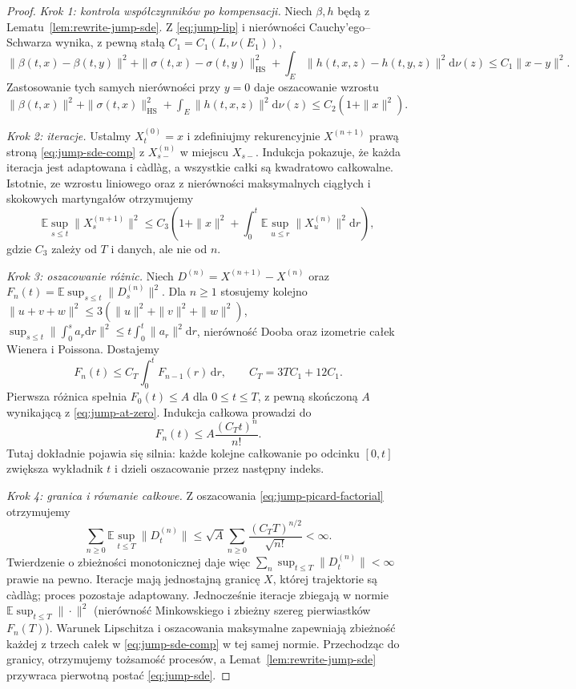 \documentclass[11pt,a4paper,oneside]{report}
\numberwithin{equation}{chapter}
\theoremstyle{plain}
\theoremstyle{definition}
\theoremstyle{remark}
\newcommand{\E}{\mathbb{E}}
\newcommand{\dd}{\mathrm{d}}
\begin{document}
\begin{proof}
\emph{Krok 1: kontrola współczynników po kompensacji.}
Niech $\beta,h$ będą z Lematu~\ref{lem:rewrite-jump-sde}.
Z \eqref{eq:jump-lip} i nierówności Cauchy'ego--Schwarza
wynika, z pewną stałą $C_1=C_1(L,\nu(E_1))$,
\[
\|\beta(t,x)-\beta(t,y)\|^2
+\|\sigma(t,x)-\sigma(t,y)\|_{\mathrm{HS}}^2
+\int_E\|h(t,x,z)-h(t,y,z)\|^2\dd\nu(z)
\le C_1\|x-y\|^2.
\]
Zastosowanie tych samych nierówności przy $y=0$ daje
oszacowanie wzrostu
$\|\beta(t,x)\|^2+\|\sigma(t,x)\|_{\mathrm{HS}}^2+
\int_E\|h(t,x,z)\|^2\dd\nu(z)
\le C_2(1+\|x\|^2)$.

\emph{Krok 2: iteracje.} Ustalmy $X^{(0)}_t=x$ i
zdefiniujmy rekurencyjnie $X^{(n+1)}$ prawą stroną
\eqref{eq:jump-sde-comp} z $X^{(n)}_{s-}$ w miejscu $X_{s-}$.
Indukcja pokazuje, że każda iteracja jest adaptowana i càdlàg,
a wszystkie całki są kwadratowo całkowalne. Istotnie,
ze wzrostu liniowego oraz z nierówności maksymalnych
ciągłych i skokowych martyngałów otrzymujemy
\[
\E\sup_{s\le t}\|X^{(n+1)}_s\|^2
\le C_3\left(1+\|x\|^2+
 \int_0^t\E\sup_{u\le r}\|X^{(n)}_u\|^2\dd r\right),
\]
gdzie $C_3$ zależy od $T$ i danych, ale nie od $n$.

\emph{Krok 3: oszacowanie różnic.} Niech
$D^{(n)}=X^{(n+1)}-X^{(n)}$ oraz
$F_n(t)=\E\sup_{s\le t}\|D^{(n)}_s\|^2$.
Dla $n\ge1$ stosujemy kolejno
$\|u+v+w\|^2\le3(\|u\|^2+\|v\|^2+\|w\|^2)$,
$\sup_{s\le t}\|\int_0^s a_r\dd r\|^2
\le t\int_0^t\|a_r\|^2\dd r$, nierówność Dooba
oraz izometrie całek Wienera i Poissona. Dostajemy
\[
 F_n(t)\le C_T\int_0^t F_{n-1}(r)\,\dd r,
 \qquad C_T=3TC_1+12C_1.
 \tag{13.5}\label{eq:jump-picard-est}
\]
Pierwsza różnica spełnia $F_0(t)\le A$ dla $0\le t\le T$,
z pewną skończoną $A$ wynikającą z \eqref{eq:jump-at-zero}.
Indukcja całkowa prowadzi do
\[
 F_n(t)\le A\frac{(C_Tt)^n}{n!}.
 \tag{13.6}\label{eq:jump-picard-factorial}
\]
Tutaj dokładnie pojawia się silnia: każde kolejne
całkowanie po odcinku $[0,t]$ zwiększa wykładnik $t$
i dzieli oszacowanie przez następny indeks.

\emph{Krok 4: granica i równanie całkowe.} Z oszacowania
\eqref{eq:jump-picard-factorial} otrzymujemy
\[
\sum_{n\ge0}\E\sup_{t\le T}\|D^{(n)}_t\|
\le \sqrt A\sum_{n\ge0}\frac{(C_TT)^{n/2}}{\sqrt{n!}}<\infty.
\]
Twierdzenie o zbieżności monotonicznej daje więc
$\sum_n\sup_{t\le T}\|D^{(n)}_t\|<\infty$ prawie na pewno.
Iteracje mają jednostajną granicę $X$, której trajektorie
są càdlàg; proces pozostaje adaptowany.
Jednocześnie iteracje zbiegają w normie
$\E\sup_{t\le T}\|\cdot\|^2$ (nierówność Minkowskiego
i zbieżny szereg pierwiastków $F_n(T)$).
Warunek Lipschitza i oszacowania maksymalne zapewniają
zbieżność każdej z trzech całek w \eqref{eq:jump-sde-comp}
w tej samej normie. Przechodząc do granicy, otrzymujemy
tożsamość procesów, a Lemat~\ref{lem:rewrite-jump-sde}
przywraca pierwotną postać \eqref{eq:jump-sde}.


\end{proof}
\end{document}
